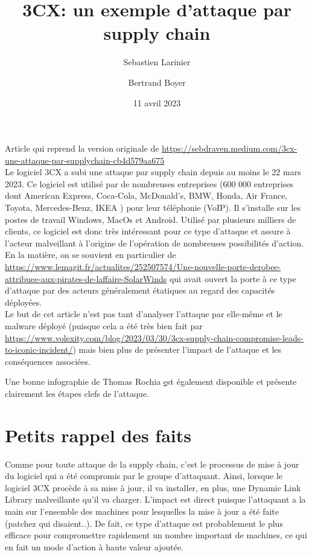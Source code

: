 \documentclass[a4paper]{article}
\title{3CX: un exemple d'attaque par supply chain }
\author{Sebastien Larinier \and Bertrand Boyer} %
\date{11 avril 2023}
\begin{document}
\maketitle                 

Article qui reprend la version originale de \href{Seb sur Medium }{https://sebdraven.medium.com/3cx-une-attaque-par-supplychain-cb4d579aa675}
\\

Le logiciel 3CX a subi une attaque par supply chain depuis au moins le 22 mars 2023. Ce logiciel est utilisé par de nombreuses entreprises (600 000 entreprises dont American Express, Coca-Cola, McDonald’s, BMW, Honda, Air France, Toyota, Mercedes-Benz, IKEA ) pour leur téléphonie (VoIP). Il s'installe sur les postes de travail Windows, MacOs et Android. Utilisé par plusieurs milliers de clients, ce logiciel est donc très intéressant pour ce type d'attaque et assure à l'acteur malveillant à l'origine de l'opération de nombreuses possibilités d'action. En la matière, on se souvient en particulier de \href{Solar Wind}{https://www.lemagit.fr/actualites/252507574/Une-nouvelle-porte-derobee-attribuee-aux-pirates-de-laffaire-SolarWinds} qui avait ouvert la porte à ce type d'attaque par des acteurs généralement étatiques au regard des capacités déployées.
\\

Le but de cet article n'est pas tant d'analyser l'attaque par elle-même et le malware déployé (puisque cela a été très bien fait par  \href{Volexity}{https://www.volexity.com/blog/2023/03/30/3cx-supply-chain-compromise-leads-to-iconic-incident/}) mais bien plus de présenter l'impact de l'attaque et les conséquences associées.

Une bonne infographie de Thomas Rochia \href{https://twitter.com/fr0gger_/status/1641668394155151366?s=20} est également disponible et présente clairement les étapes clefs de l'attaque.
\\

\section{Petits rappel des faits}

Comme pour toute attaque de la supply chain, c'est le processus de mise à jour du logiciel qui a été compromis par le groupe d'attaquant. Ainsi, lorsque le logiciel 3CX procède à sa mise à jour, il va installer, en plus, une Dynamic Link Library malveillante qu'il va charger. L'impact est direct puisque l'attaquant a la main sur l'ensemble des machines pour lesquelles la mise à jour a été faite (patchez qui disaient..). De fait, ce type d'attaque est probablement le plus efficace pour compromettre rapidement un nombre important de machines, ce qui en fait un mode d'action à haute valeur ajoutée.
\\
\end{document}
